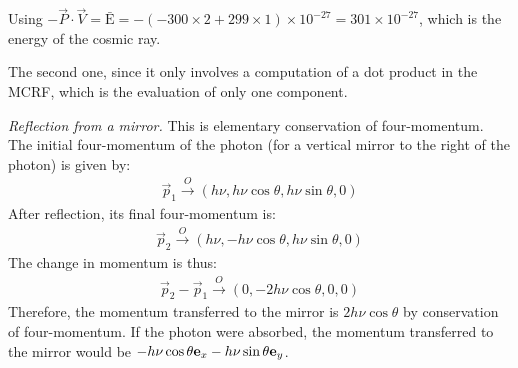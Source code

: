 \documentclass{report}
\begin{document}
\begin{subquests}
\begin{subquests}
		\item
		Using $-{\vec P} \cdot \vec V = {\mathrm{\bar E}} = -(-300 \times 2 + 299 \times 1) \times 10^{-27} = 301 \times 10^{-27}$, which is the energy of the cosmic ray.

		\item The second one, since it only involves a computation of a dot product in the MCRF, which is the evaluation of only one component.
	\end{subquests}

	\item \emph{Reflection from a mirror.}
	This is elementary conservation of four-momentum. The initial four-momentum of the photon (for a vertical mirror to the right of the photon) is given by:
	\begin{gather*}
		\vec p_1 \stackrel{O}\longrightarrow (h\nu, h\nu\cos\theta, h\nu\sin\theta, 0)
	\end{gather*}
	After reflection, its final four-momentum is:
	\begin{gather*}
		\vec p_2 \stackrel{O}\longrightarrow (h\nu, -h\nu\cos\theta, h\nu\sin\theta, 0)
	\end{gather*}
	The change in momentum is thus:
	\begin{gather*}
		\vec p_2 - \vec p_1 \stackrel{O}\longrightarrow (0, -2h\nu\cos\theta, 0, 0)
	\end{gather*}
	Therefore, the momentum transferred to the mirror is $2h\nu\cos\theta$ by conservation of four-momentum. If the photon were absorbed, the momentum transferred to the mirror would be $-h\nu \cos\theta \vb{e}_x - h\nu \sin\theta \vb{e}_y$.


\end{subquests}
\end{document}
